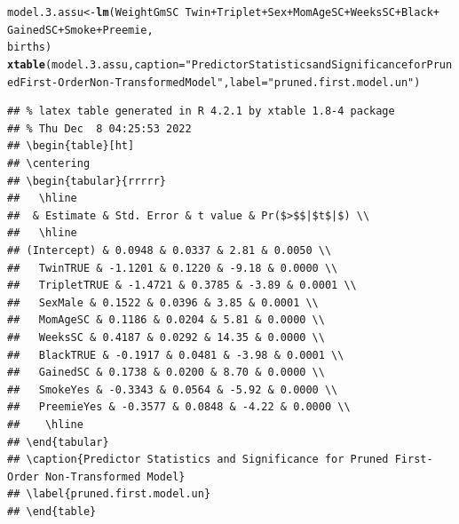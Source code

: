 \documentclass{article}\usepackage[]{graphicx}\usepackage[]{xcolor}
\makeatletter
\newcommand{\hlstr}[1]{\textcolor[rgb]{0.192,0.494,0.8}{#1}}%
\newcommand{\hlopt}[1]{\textcolor[rgb]{0,0,0}{#1}}%
\newcommand{\hlstd}[1]{\textcolor[rgb]{0.345,0.345,0.345}{#1}}%
\newcommand{\hlkwb}[1]{\textcolor[rgb]{0.69,0.353,0.396}{#1}}%
\newcommand{\hlkwc}[1]{\textcolor[rgb]{0.333,0.667,0.333}{#1}}%
\newcommand{\hlkwd}[1]{\textcolor[rgb]{0.737,0.353,0.396}{\textbf{#1}}}%
\newenvironment{kframe}{%
 \def\at@end@of@kframe{}%
 \ifinner\ifhmode%
  \def\at@end@of@kframe{\end{minipage}}%
  \begin{minipage}{\columnwidth}%
 \fi\fi%
 \def\FrameCommand##1{\hskip\@totalleftmargin \hskip-\fboxsep
 \colorbox{shadecolor}{##1}\hskip-\fboxsep
     \hskip-\linewidth \hskip-\@totalleftmargin \hskip\columnwidth}%
 \MakeFramed {\advance\hsize-\width
   \@totalleftmargin\z@ \linewidth\hsize
   \@setminipage}}%
 {\par\unskip\endMakeFramed%
 \at@end@of@kframe}
\newenvironment{knitrout}{}{} %
\makeatother
\begin{document}
\begin{knitrout}
\color{fgcolor}\begin{kframe}
\begin{alltt}
\hlstd{model.3.assu} \hlkwb{<-} \hlkwd{lm}\hlstd{(WeightGmSC} \hlopt{~} \hlstd{Twin} \hlopt{+} \hlstd{Triplet} \hlopt{+} \hlstd{Sex} \hlopt{+} \hlstd{MomAgeSC} \hlopt{+} \hlstd{WeeksSC} \hlopt{+} \hlstd{Black} \hlopt{+}
                      \hlstd{GainedSC} \hlopt{+} \hlstd{Smoke} \hlopt{+} \hlstd{Preemie,}
                    \hlstd{births)}
\hlkwd{xtable}\hlstd{(model.3.assu,} \hlkwc{caption}\hlstd{=}\hlstr{"Predictor Statistics and Significance for Pruned First-Order Non-Transformed Model"}\hlstd{,} \hlkwc{label}\hlstd{=}\hlstr{"pruned.first.model.un"}\hlstd{)}
\end{alltt}
\begin{verbatim}
## % latex table generated in R 4.2.1 by xtable 1.8-4 package
## % Thu Dec  8 04:25:53 2022
## \begin{table}[ht]
## \centering
## \begin{tabular}{rrrrr}
##   \hline
##  & Estimate & Std. Error & t value & Pr($>$$|$t$|$) \\ 
##   \hline
## (Intercept) & 0.0948 & 0.0337 & 2.81 & 0.0050 \\ 
##   TwinTRUE & -1.1201 & 0.1220 & -9.18 & 0.0000 \\ 
##   TripletTRUE & -1.4721 & 0.3785 & -3.89 & 0.0001 \\ 
##   SexMale & 0.1522 & 0.0396 & 3.85 & 0.0001 \\ 
##   MomAgeSC & 0.1186 & 0.0204 & 5.81 & 0.0000 \\ 
##   WeeksSC & 0.4187 & 0.0292 & 14.35 & 0.0000 \\ 
##   BlackTRUE & -0.1917 & 0.0481 & -3.98 & 0.0001 \\ 
##   GainedSC & 0.1738 & 0.0200 & 8.70 & 0.0000 \\ 
##   SmokeYes & -0.3343 & 0.0564 & -5.92 & 0.0000 \\ 
##   PreemieYes & -0.3577 & 0.0848 & -4.22 & 0.0000 \\ 
##    \hline
## \end{tabular}
## \caption{Predictor Statistics and Significance for Pruned First-Order Non-Transformed Model} 
## \label{pruned.first.model.un}
## \end{table}
\end{verbatim}
\end{kframe}
\end{knitrout}
\end{document}
